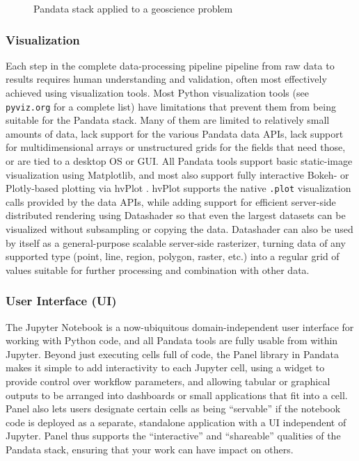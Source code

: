 \begin{figure}[h]
    \noindent{}
    \caption{Pandata stack applied to a geoscience problem\label{pandata-geoscience}}
\end{figure}
\subsubsection{Visualization}

Each step in the complete data-processing pipeline pipeline from raw data to results requires human understanding and validation, often most effectively achieved using visualization tools. Most Python visualization tools (see \texttt{pyviz.org} for a complete list) have limitations that prevent them from being suitable for the Pandata stack. Many of them are limited to relatively small amounts of data, lack support for the various Pandata data APIs, lack support for multidimensional arrays or unstructured grids for the fields that need those, or are tied to a desktop OS or GUI. All Pandata tools support basic static-image visualization using Matplotlib, and most also support fully interactive Bokeh- or Plotly-based plotting via hvPlot \cite{rudiger:hvplot}. hvPlot supports the native \texttt{.plot} visualization calls provided by the data APIs, while adding support for efficient server-side distributed rendering using Datashader so that even the largest datasets can be visualized without subsampling or copying the data. Datashader can also be used by itself as a general-purpose scalable server-side rasterizer, turning data of any supported type (point, line, region, polygon, raster, etc.) into a regular grid of values suitable for further processing and combination with other data.

\subsubsection{User Interface (UI)}

The Jupyter Notebook is a now-ubiquitous domain-independent user interface for working with Python code, and all Pandata tools are fully usable from within Jupyter. Beyond just executing cells full of code, the Panel library in Pandata makes it simple to add interactivity to each Jupyter cell, using a widget to provide control over workflow parameters, and allowing tabular or graphical outputs to be arranged into dashboards or small applications that fit into a cell. Panel also lets users designate certain cells as being ``servable'' if the notebook code is deployed as a separate, standalone application with a UI independent of Jupyter. Panel thus supports the ``interactive'' and ``shareable'' qualities of the Pandata stack, ensuring that your work can have impact on others.

